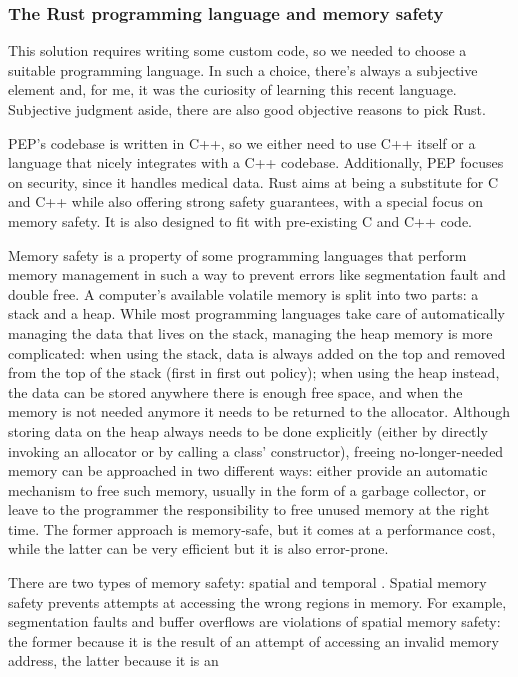 \documentclass{report}
\begin{document}
\subsubsection{The Rust programming language and memory safety} \label{rust_memory_safety}
This solution requires writing some custom code, so we needed to choose a suitable programming language. In such a choice, there's always a subjective element and, for me, it was
the curiosity of learning this recent language. Subjective judgment aside, there are also good objective reasons to pick Rust. \par
PEP's codebase is written in C++, so we either need to use C++ itself or a language that nicely integrates with a C++ codebase. Additionally, PEP focuses on security, since it
handles medical data. Rust aims at being a substitute for C and C++ while also offering strong safety guarantees, with a special focus on memory safety. It is also designed to fit
with pre-existing C and C++ code. \par
Memory safety is a property of some programming languages that perform memory management in such a way to prevent errors like segmentation fault and double free. A computer's
available volatile memory is split into two parts: a stack and a heap. While most programming languages take care of automatically managing the data that lives on the stack,
managing the heap memory is more complicated: when using the stack, data is always added on the top and removed from the top of the stack (first in first out policy); when using the heap instead, the data can
be stored anywhere there is enough free space, and when the memory is not needed anymore it needs to be returned to the allocator. Although storing data on the heap always needs to
be done explicitly (either by directly invoking an allocator or by calling a class' constructor), freeing no-longer-needed memory can be approached in two different ways: either provide an automatic mechanism to free such memory, usually in the form of a
garbage collector, or leave to the programmer the responsibility to free unused memory at the right time. The former approach is memory-safe, but it comes at a performance cost,
while the latter can be very efficient but it is also error-prone. \par
There are two types of memory safety: spatial and temporal \cite{eternal-war-in-memory}. Spatial memory safety prevents attempts at accessing the wrong regions in memory. For example, segmentation faults and
buffer overflows are violations of spatial memory safety: the former because it is the result of an attempt of accessing an invalid memory address, the latter because it is an
\end{document}
